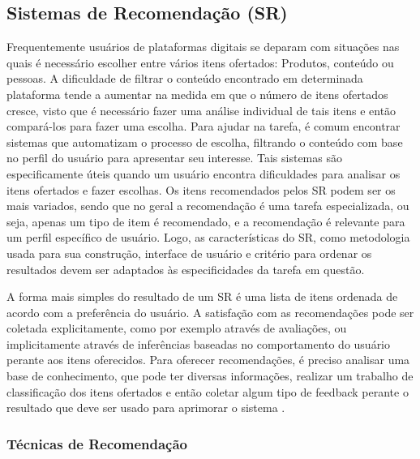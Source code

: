 \documentclass[12pt]{article}
\begin{document}
\subsection{Sistemas de Recomendação (SR)}

Frequentemente usuários de plataformas digitais se deparam com situações nas quais é necessário escolher entre 
vários itens ofertados: Produtos, conteúdo ou pessoas. A dificuldade de filtrar o conteúdo encontrado em determinada 
plataforma tende a aumentar na medida em que o número de itens ofertados cresce, visto que é necessário fazer uma 
análise individual de tais itens e então compará-los para fazer uma escolha. Para ajudar na tarefa, é comum encontrar 
sistemas que automatizam o processo de escolha, filtrando o conteúdo com base no perfil do usuário para apresentar 
seu interesse. Tais sistemas são especificamente úteis quando um usuário encontra dificuldades para analisar os itens 
ofertados e fazer escolhas. Os itens recomendados pelos SR podem ser os mais variados, sendo que no geral a recomendação 
é uma tarefa especializada, ou seja, apenas um tipo de item é recomendado, e a recomendação é relevante para um perfil 
específico de usuário. Logo, as características do SR, como metodologia usada para sua construção, interface de usuário 
e critério para ordenar os resultados devem ser adaptados às especificidades da tarefa em questão. 

A forma mais simples do resultado de um SR é uma lista de itens ordenada de acordo com a preferência do usuário. A satisfação 
com as recomendações pode ser coletada explicitamente, como por exemplo através de avaliações, ou implicitamente através de 
inferências baseadas no comportamento do usuário perante aos itens oferecidos. Para oferecer recomendações, é preciso analisar 
uma base de conhecimento, que pode ter diversas informações, realizar um trabalho de classificação dos itens ofertados e 
então coletar algum tipo de feedback perante o resultado que deve ser usado para aprimorar o sistema \cite{ricci2011introduction}.

\subsubsection{Técnicas de Recomendação}
\end{document}

